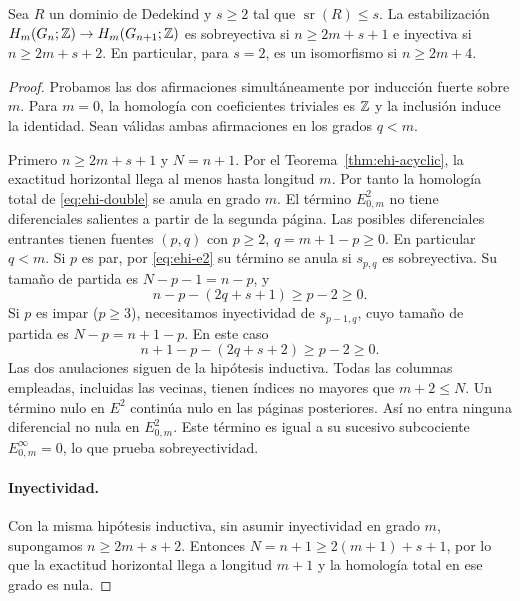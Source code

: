 \begin{teorema}
\label{thm:ehi-stability}
Sea $R$ un dominio de Dedekind y $s\ge2$ tal que $\operatorname{sr}(R)\le s$. La estabilización $H_m(G_n;\mathbb{Z})\to H_m(G_{n+1};\mathbb{Z})$ es sobreyectiva si $n\ge2m+s+1$ e inyectiva si $n\ge2m+s+2$. En particular, para $s=2$, es un isomorfismo si $n\ge2m+4$.
\end{teorema}
\begin{proof}
Probamos las dos afirmaciones simultáneamente por inducción fuerte sobre $m$. Para $m=0$, la homología con coeficientes triviales es $\mathbb{Z}$ y la inclusión induce la identidad. Sean válidas ambas afirmaciones en los grados $q<m$.

Primero $n\ge2m+s+1$ y $N=n+1$. Por el Teorema~\ref{thm:ehi-acyclic}, la exactitud horizontal llega al menos hasta longitud $m$. Por tanto la homología total de \eqref{eq:ehi-double} se anula en grado $m$. El término $E^2_{0,m}$ no tiene diferenciales salientes a partir de la segunda página. Las posibles diferenciales entrantes tienen fuentes $(p,q)$ con $p\ge2$, $q=m+1-p\ge0$. En particular $q<m$. Si $p$ es par, por \eqref{eq:ehi-e2} su término se anula si $s_{p,q}$ es sobreyectiva. Su tamaño de partida es $N-p-1=n-p$, y
\begin{equation}
 n-p-(2q+s+1)\ge p-2\ge0.
 \label{eq:ehi-surj-even}
\end{equation}
Si $p$ es impar ($p\ge3$), necesitamos inyectividad de $s_{p-1,q}$, cuyo tamaño de partida es $N-p=n+1-p$. En este caso
\begin{equation}
 n+1-p-(2q+s+2)\ge p-2\ge0.
 \label{eq:ehi-surj-odd}
\end{equation}
Las dos anulaciones siguen de la hipótesis inductiva. Todas las columnas empleadas, incluidas las vecinas, tienen índices no mayores que $m+2\le N$. Un término nulo en $E^2$ continúa nulo en las páginas posteriores. Así no entra ninguna diferencial no nula en $E^2_{0,m}$. Este término es igual a su sucesivo subcociente $E^\infty_{0,m}=0$, lo que prueba sobreyectividad.

\paragraph{Inyectividad.} Con la misma hipótesis inductiva, sin asumir inyectividad en grado $m$, supongamos $n\ge2m+s+2$. Entonces $N=n+1\ge2(m+1)+s+1$, por lo que la exactitud horizontal llega a longitud $m+1$ y la homología total en ese grado es nula.


\end{proof}
